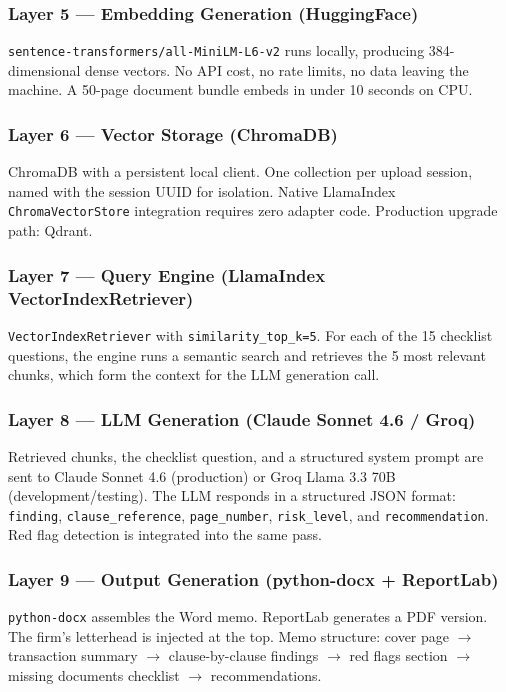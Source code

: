 \documentclass[12pt, a4paper]{article}
\begin{document}
\subsubsection{Layer 5 --- Embedding Generation (HuggingFace)}
\texttt{sentence-transformers/all-MiniLM-L6-v2} runs locally, producing
384-dimensional dense vectors. No API cost, no rate limits, no data leaving the
machine. A 50-page document bundle embeds in under 10 seconds on CPU.

\subsubsection{Layer 6 --- Vector Storage (ChromaDB)}
ChromaDB with a persistent local client. One collection per upload session, named
with the session UUID for isolation. Native LlamaIndex \texttt{ChromaVectorStore}
integration requires zero adapter code. Production upgrade path: Qdrant.

\subsubsection{Layer 7 --- Query Engine (LlamaIndex VectorIndexRetriever)}
\texttt{VectorIndexRetriever} with \texttt{similarity\_top\_k=5}. For each of the
15 checklist questions, the engine runs a semantic search and retrieves the 5
most relevant chunks, which form the context for the LLM generation call.

\subsubsection{Layer 8 --- LLM Generation (Claude Sonnet 4.6 / Groq)}
Retrieved chunks, the checklist question, and a structured system prompt are sent
to Claude Sonnet 4.6 (production) or Groq Llama 3.3 70B (development/testing).
The LLM responds in a structured JSON format: \texttt{finding},
\texttt{clause\_reference}, \texttt{page\_number}, \texttt{risk\_level}, and
\texttt{recommendation}. Red flag detection is integrated into the same pass.

\subsubsection{Layer 9 --- Output Generation (python-docx + ReportLab)}
\texttt{python-docx} assembles the Word memo. ReportLab generates a PDF version.
The firm's letterhead is injected at the top. Memo structure: cover page
$\rightarrow$ transaction summary $\rightarrow$ clause-by-clause findings
$\rightarrow$ red flags section $\rightarrow$ missing documents checklist
$\rightarrow$ recommendations.
\end{document}
